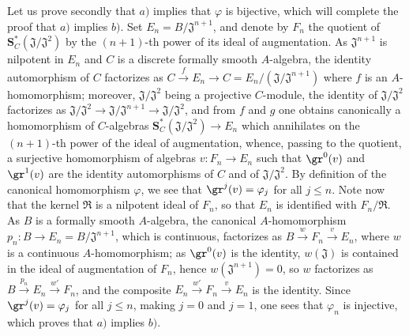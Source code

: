 \begin{env}[19.5.4.2]
\label{0.19.5.4.2}
Let us prove secondly that $a)$ implies that $\varphi$ is bijective, which will complete the proof that $a)$ implies $b)$.
Set $E_n=B/\mathfrak{J}^{n+1}$, and denote by $F_n$ the quotient of $\mathbf{S}_C^*(\mathfrak{J}/\mathfrak{J}^2)$ by the $(n+1)$-th power of its ideal of augmentation.
As $\mathfrak{J}^{n+1}$ is nilpotent in $E_n$ and $C$ is a discrete formally smooth $A$-algebra, the identity automorphism of $C$ factorizes as $C\xrightarrow{f}E_n\to C=E_n/(\mathfrak{J}/\mathfrak{J}^{n+1})$ where $f$ is an $A$-homomorphism;
moreover, $\mathfrak{J}/\mathfrak{J}^2$ being a projective $C$-module, the identity of $\mathfrak{J}/\mathfrak{J}^2$ factorizes as $\mathfrak{J}/\mathfrak{J}^2\to\mathfrak{J}/\mathfrak{J}^{n+1}\to\mathfrak{J}/\mathfrak{J}^2$, and from $f$ and $g$ one obtains canonically a homomorphism of $C$-algebras $\mathbf{S}_C^*(\mathfrak{J}/\mathfrak{J}^2)\to E_n$ which annihilates on the $(n+1)$-th power of the ideal of augmentation, whence, passing to the quotient, a surjective homomorphism of algebras $v:F_n\to E_n$ such that $\gr^0(v)$ and $\gr^1(v)$ are the identity automorphisms of $C$ and of $\mathfrak{J}/\mathfrak{J}^2$.
By definition of the canonical homomorphism $\varphi$, we see that $\gr^j(v)=\varphi_j$ for all $j\leq n$.
Note now that the kernel $\mathfrak{R}$ is a nilpotent ideal of $F_n$, so that $E_n$ is identified with $F_n/\mathfrak{R}$.
As $B$ is a formally smooth $A$-algebra, the canonical $A$-homomorphism $p_n:B\to E_n=B/\mathfrak{J}^{n+1}$, which is continuous, factorizes as $B\xrightarrow{w}F_n\xrightarrow{v}E_n$, where $w$ is a continuous $A$-homomorphism;
as $\gr^0(v)$ is the identity, $w(\mathfrak{J})$ is contained in the ideal of augmentation of $F_n$, hence $w(\mathfrak{J}^{n+1})=0$,
so $w$ factorizes as $B\xrightarrow{p_n}E_n\xrightarrow{w'}F_n$, and the composite $E_n\xrightarrow{w'}F_n\xrightarrow{v}E_n$ is the identity.
Since $\gr^j(v)=\varphi_j$ for all $j\leq n$, making $j=0$ and $j=1$, one sees that $\varphi_n$ is injective, which proves that $a)$ implies $b)$.
\end{env}

